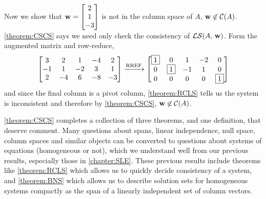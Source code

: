 \documentclass{ximera}
\begin{document}
\begin{example}
  Now we show that $\mathbf{w}=\begin{bmatrix}2\\1\\-3\end{bmatrix}$ is not in the
  column space of $A$, $\mathbf{w}\not\in\mathcal{C}\!\left(A\right)$.  \ref{theorem:CSCS}
  says we need only check the consistency of
  $\mathcal{LS}\!\left(A,\,\mathbf{w}\right)$.  Form the augmented matrix and
  row-reduce,
  \[
    \begin{bmatrix}
      3 & 2 & 1 & -4 & 2\\
      -1 & 1 & -2 & 3 & 1\\
      2 & -4 & 6 & -8 & -3
    \end{bmatrix}
    \xrightarrow{\text{RREF}}
    \begin{bmatrix}
      \fbox{1} & 0 & 1 & -2 & 0\\
      0 & \fbox{1} & -1 & 1 & 0\\
      0 & 0 & 0 & 0 & \fbox{1}
    \end{bmatrix}
  \]
  and since the final column is a pivot column, \ref{theorem:RCLS}
  tells us the system is inconsistent and therefore by
  \ref{theorem:CSCS}, $\mathbf{w}\not\in\mathcal{C}\!\left(A\right)$.

\end{example}

\ref{theorem:CSCS} completes a collection of three theorems, and one
definition, that deserve comment.  Many questions about spans, linear
independence, null space, column spaces and similar objects can be
converted to questions about systems of equations (homogeneous or
not), which we understand well from our previous results, especially
those in \ref{chapter:SLE}.  These previous results include theorems
like \ref{theorem:RCLS} which allows us to quickly decide consistency
of a system, and \ref{theorem:BNS} which allows us to describe
solution sets for homogeneous systems compactly as the span of a
linearly independent set of column vectors.
\end{document}
